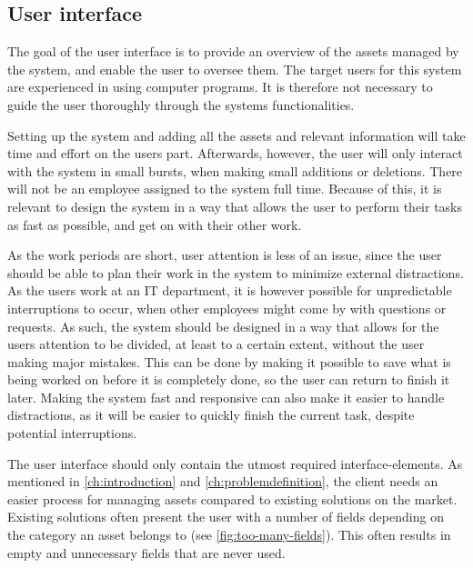 \subsection{User interface}\label{ssc:UIAnalysis}
The goal of the user interface is to provide an overview of the assets managed by the system, and enable the user to oversee them. The target users for this system are experienced in using computer programs. It is therefore not necessary to guide the user thoroughly through the systems functionalities.
\par

Setting up the system and adding all the assets and relevant information will take time and effort on the users part. Afterwards, however, the user will only interact with the system in small bursts, when making small additions or deletions. There will not be an employee assigned to the system full time. Because of this, it is relevant to design the system in a way that allows the user to perform their tasks as fast as possible, and get on with their other work.
\par
As the work periods are short, user attention is less of an issue, since the user should be able to plan their work in the system to minimize external distractions. As the users work at an IT department, it is however possible for unpredictable interruptions to occur, when other employees might come by with questions or requests. As such, the system should be designed in a way that allows for the users attention to be divided, at least to a certain extent, without the user making major mistakes. This can be done by making it possible to save what is being worked on before it is completely done, so the user can return to finish it later. Making the system fast and responsive can also make it easier to handle distractions, as it will be easier to quickly finish the current task, despite potential interruptions. 
\par

The user interface should only contain the utmost required interface-elements. As mentioned in \autoref{ch:introduction} and \autoref{ch:problemdefinition}, the client needs an easier process for managing assets compared to existing solutions on the market. Existing solutions often present the user with a number of fields depending on the category an asset belongs to (see \autoref{fig:too-many-fields}). This often results in empty and unnecessary fields that are never used. 

